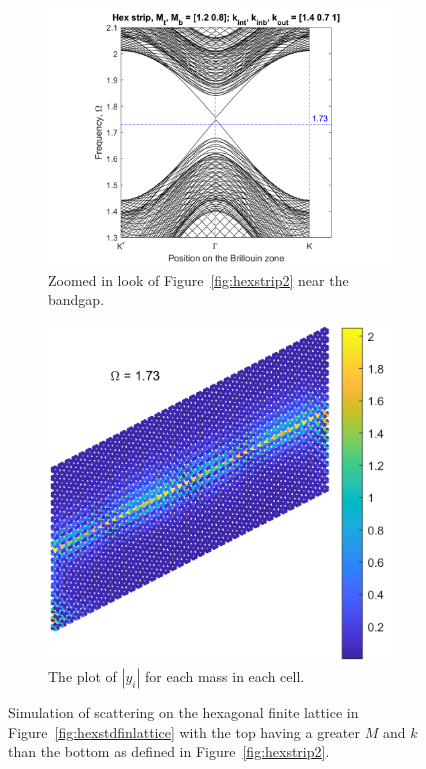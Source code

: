 \begin{figure}
\centering
\begin{subfigure}[b]{.5\textwidth}
  \centering
  \includegraphics[width=1.1\linewidth]{imgs/hexstripperturb2zoom.png}
  \caption{Zoomed in look of Figure~\ref{fig:hexstrip2} near the bandgap.}
  \label{fig:sub1}
\end{subfigure}%
\begin{subfigure}[b]{.5\textwidth}
  \centering
  \includegraphics[width=1\linewidth]{imgs/hexstdMk.png}
  \caption{The plot of $|y_i|$ for each mass in each cell.}
  \label{fig:sub2}
\end{subfigure}
\caption{Simulation of scattering on the hexagonal finite lattice in
  Figure~\ref{fig:hexstdfinlattice} with the top having a greater $M$ and $k$
  than the bottom as defined in Figure~\ref{fig:hexstrip2}.}
\label{fig:hexstdMk}
\end{figure}

